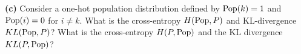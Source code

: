 \documentclass{article}
\newcommand{\solution}[1]{}
\begin{document}
{\bf (c)} Consider a one-hot population distribution defined by $\mathrm{Pop}(k) = 1$ and $\mathrm{Pop}(i) = 0$ for $i \not = k$.
What is the cross-entropy $H(\mathrm{Pop},P)$ and KL-divergence $KL(\mathrm{Pop},P)$?  What is the cross-entropy $H(P,\mathrm{Pop})$ and the KL divergence $KL(P,\mathrm{Pop})$?

\solution{
  \begin{eqnarray*}
    H(\pop,P) & = & E_{i\sim \pop}\left[ - \ln P(i)\right] \\
    & = & -\ln P(k) \\
    & = & -\ln (\;(1-e^{-\beta})e^{-\beta k}\;) \\
    & = & \beta k - \ln(1-e^{-\beta}) \\
      \\
      KL(\pop,P) & = & H(\pop,P) - H(\pop) \\
      & =& \beta k - \ln (1-e^{-\beta}) - 0 \\
      \\
      H(P,\pop) & = & KL(P,\pop) = \infty
  \end{eqnarray*}
}
\end{document}
